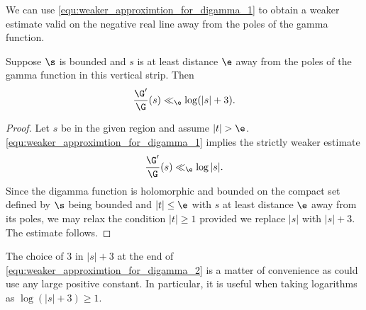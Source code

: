   We can use \cref{equ:weaker_approximtion_for_digamma_1} to obtain a weaker estimate valid on the negative real line away from the poles of the gamma function.

  \begin{corollary}\label{equ:weaker_approximtion_for_digamma_2}
    Suppose \(\s\) is bounded and \(s\) is at least distance \(\e\) away from the poles of the gamma function in this vertical strip. Then
    \[
      \frac{\G'}{\G}(s) \ll_{\e} \log(|s|+3).
    \]
  \end{corollary}
  \begin{proof}
    Let \(s\) be in the given region and assume \(|t| > \e\). \cref{equ:weaker_approximtion_for_digamma_1} implies the strictly weaker estimate
    \[
      \frac{\G'}{\G}(s) \ll_{\e} \log|s|.
    \]
    Since the digamma function is holomorphic and bounded on the compact set defined by \(\s\) being bounded and \(|t| \le \e\) with \(s\) at least distance \(\e\) away from its poles, we may relax the condition \(|t| \ge 1\) provided we replace \(|s|\) with \(|s|+3\). The estimate follows.
  \end{proof}

  The choice of \(3\) in \(|s|+3\) at the end of \cref{equ:weaker_approximtion_for_digamma_2} is a matter of convenience as could use any large positive constant. In particular, it is useful when taking logarithms as \(\log(|s|+3) \ge 1\).